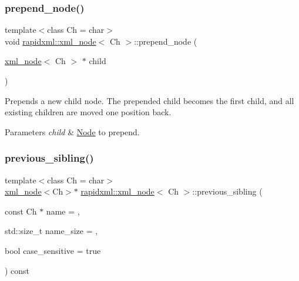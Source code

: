 \subsubsection{\texorpdfstring{prepend\+\_\+node()}{prepend\_node()}}
{\footnotesize\ttfamily template$<$class Ch = char$>$ \\
void \hyperlink{classrapidxml_1_1xml__node}{rapidxml\+::xml\+\_\+node}$<$ Ch $>$\+::prepend\+\_\+node (\begin{DoxyParamCaption}\item[{\hyperlink{classrapidxml_1_1xml__node}{xml\+\_\+node}$<$ Ch $>$ $\ast$}]{child }\end{DoxyParamCaption})\hspace{0.3cm}{\ttfamily [inline]}}

Prepends a new child node. The prepended child becomes the first child, and all existing children are moved one position back. 
\begin{DoxyParams}{Parameters}
{\em child} & \hyperlink{classNode}{Node} to prepend. \\
\hline
\end{DoxyParams}
\mbox{\label{classrapidxml_1_1xml__node_aebcc42042ded78fb7020e2783f7d5426}} 
\subsubsection{\texorpdfstring{previous\+\_\+sibling()}{previous\_sibling()}}
{\footnotesize\ttfamily template$<$class Ch = char$>$ \\
\hyperlink{classrapidxml_1_1xml__node}{xml\+\_\+node}$<$Ch$>$$\ast$ \hyperlink{classrapidxml_1_1xml__node}{rapidxml\+::xml\+\_\+node}$<$ Ch $>$\+::previous\+\_\+sibling (\begin{DoxyParamCaption}\item[{const Ch $\ast$}]{name = {},  }\item[{std\+::size\+\_\+t}]{name\+\_\+size = {},  }\item[{bool}]{case\+\_\+sensitive = {\ttfamily true} }\end{DoxyParamCaption}) const\hspace{0.3cm}{\ttfamily [inline]}}

